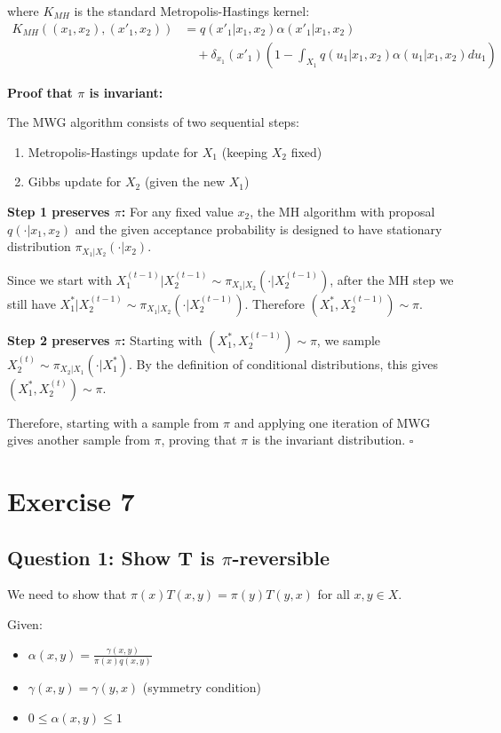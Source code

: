 \documentclass[11pt,a4paper]{article}
\begin{document}
where $K_{MH}$ is the standard Metropolis-Hastings kernel:
\begin{align}
K_{MH}((x_1, x_2), (x'_1, x_2)) &= q(x'_1|x_1, x_2)\alpha(x'_1|x_1, x_2)\\
&\quad + \delta_{x_1}(x'_1)\left(1 - \int_{X_1} q(u_1|x_1, x_2)\alpha(u_1|x_1, x_2)du_1\right)
\end{align}

\textbf{Proof that $\pi$ is invariant:}

The MWG algorithm consists of two sequential steps:
\begin{enumerate}
\item Metropolis-Hastings update for $X_1$ (keeping $X_2$ fixed)  
\item Gibbs update for $X_2$ (given the new $X_1$)
\end{enumerate}

\textbf{Step 1 preserves $\pi$:} 
For any fixed value $x_2$, the MH algorithm with proposal $q(\cdot|x_1, x_2)$ and the given acceptance probability is designed to have stationary distribution $\pi_{X_1|X_2}(\cdot|x_2)$. 

Since we start with $X_1^{(t-1)}|X_2^{(t-1)} \sim \pi_{X_1|X_2}(\cdot|X_2^{(t-1)})$, after the MH step we still have $X_1^*|X_2^{(t-1)} \sim \pi_{X_1|X_2}(\cdot|X_2^{(t-1)})$. Therefore $(X_1^*, X_2^{(t-1)}) \sim \pi$.

\textbf{Step 2 preserves $\pi$:} 
Starting with $(X_1^*, X_2^{(t-1)}) \sim \pi$, we sample $X_2^{(t)} \sim \pi_{X_2|X_1}(\cdot|X_1^*)$. By the definition of conditional distributions, this gives $(X_1^*, X_2^{(t)}) \sim \pi$.

Therefore, starting with a sample from $\pi$ and applying one iteration of MWG gives another sample from $\pi$, proving that $\pi$ is the invariant distribution. $\square$

\section{Exercise 7}

\subsection{Question 1: Show T is $\pi$-reversible}

We need to show that $\pi(x)T(x,y) = \pi(y)T(y,x)$ for all $x,y \in X$.

Given:
\begin{itemize}
\item $\alpha(x,y) = \frac{\gamma(x,y)}{\pi(x)q(x,y)}$
\item $\gamma(x,y) = \gamma(y,x)$ (symmetry condition)
\item $0 \leq \alpha(x,y) \leq 1$
\end{itemize}
\end{document}
